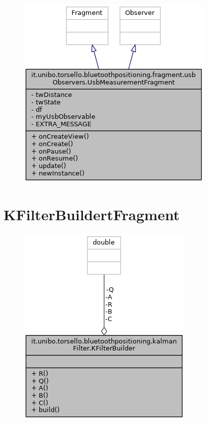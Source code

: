 \begin{figure}[ph]
	\centering
	\includegraphics[width=0.5\linewidth]{img/uml/class/classit_1_1unibo_1_1torsello_1_1bluetoothpositioning_1_1fragment_1_1usbObservers_1_1UsbMeasurementFragment__inherit__graph.png}
	\caption{}
\end{figure}

\newpage
\section{KFilterBuildertFragment}
\begin{figure}[ph]
	\centering
	\includegraphics[width=0.6\linewidth]{img/uml/class/classit_1_1unibo_1_1torsello_1_1bluetoothpositioning_1_1kalmanFilter_1_1KFilterBuilder__coll__graph.png}
	\caption{}
\end{figure}

\newpage
